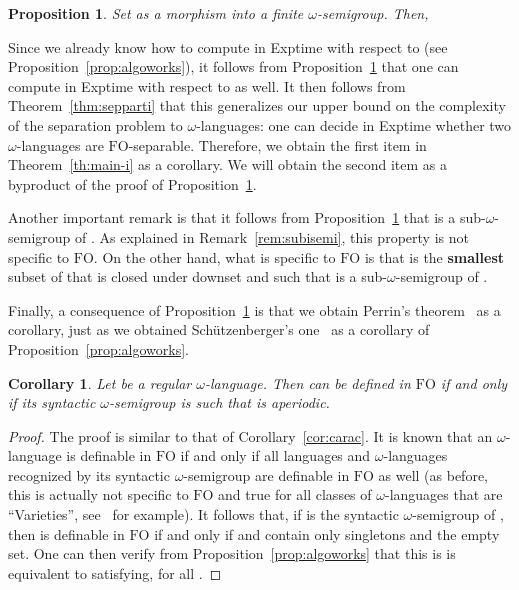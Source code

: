 \documentclass{CSML}
\newcommand{\fo}{\ensuremath{\text{FO}}\xspace}
\newcommand\ilang{\ensuremath{\omega}-language\xspace}
\newcommand\ilangs{\ensuremath{\omega}-languages\xspace}
\newcommand\sisemi{sub-\ensuremath{\omega}-semigroup\xspace}
\newcommand\isemi{\ensuremath{\omega}-semigroup\xspace}
\theoremstyle{plain}
\newtheorem{corollary}[thm]{Corollary}
\newtheorem{proposition}[thm]{Proposition}
\begin{document}
\begin{proposition} \label{prop:algoworks-i}
Set  as a morphism
into a finite \isemi . Then,

\end{proposition}\smallskip

\noindent Since we already know how to compute  in {\sc Exptime}
with respect to  (see Proposition~\ref{prop:algoworks}), it
follows from Proposition~\ref{prop:algoworks-i} that one can compute
 in {\sc Exptime} with respect to  as well.
It then follows from Theorem~\ref{thm:sepparti} that this generalizes
our upper bound on the complexity of the separation problem to
\ilangs: one can decide in {\sc Exptime} whether two \ilangs are
\fo-separable. Therefore, we obtain the first item in
Theorem~\ref{th:main-i} as a corollary. We will obtain the second item
as a byproduct of the proof of Proposition~\ref{prop:algoworks-i}.

Another important remark is that it follows from
Proposition~\ref{prop:algoworks-i} that
 is a \sisemi of
. As explained in Remark~\ref{rem:subisemi},
this property is not specific to \fo. On the other hand, what is
specific to \fo is that  is the {\bf smallest}
subset of  that is closed under downset and such that
 is a \sisemi of
.

Finally, a consequence of
Proposition~\ref{prop:algoworks-i} is that we obtain Perrin's
theorem~\cite{pfo} as a corollary, just as we obtained Schützenberger's
one~\cite{sfo} as a corollary of Proposition~\ref{prop:algoworks}.

\begin{corollary} \label{cor:caraci}
Let  be a regular \ilang. Then  can be defined in \fo if and
only if its syntactic \isemi  is such that  is
aperiodic.
\end{corollary}

\begin{proof}
The proof is similar to that of Corollary~\ref{cor:carac}. It is
known that an \ilang is definable in \fo if and only if all languages
and \ilangs recognized by its syntactic \isemi are definable in \fo as
well (as before, this is actually not specific to \fo and true for all
classes of \ilangs that are ``Varieties'',
see~\cite{Perrin&Pin:Infinite-Words:2004:a} for example). It follows
that, if  is the syntactic
\isemi of , then  is definable in \fo if and only if 
and  contain only singletons and the empty set.
One can then verify from Proposition~\ref{prop:algoworks} that this is
is equivalent to  satisfying,  for all .
\end{proof}
\end{document}

